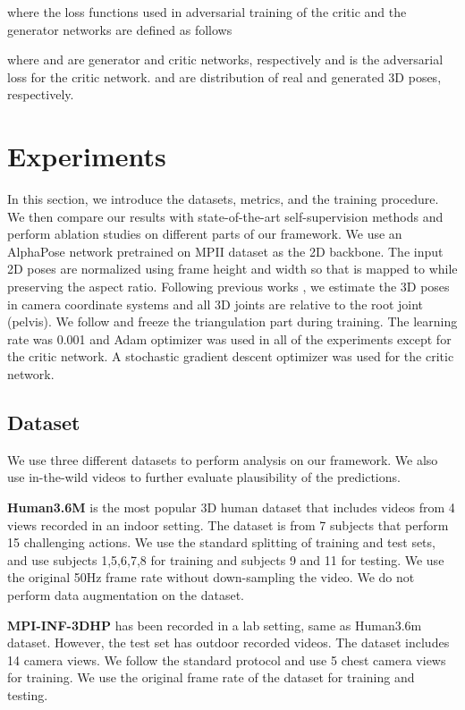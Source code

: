 \documentclass[10pt,twocolumn,letterpaper]{article}
\begin{document}
where the loss functions used in adversarial training of the critic and the generator networks are defined as follows


where  and  are generator and critic networks, respectively and  is the adversarial loss for the critic network.  and  are distribution of real and generated 3D poses, respectively. 


\section{Experiments}

In this section, we introduce the datasets, metrics, and the training procedure. We then compare our results with state-of-the-art self-supervision methods and perform ablation studies on different parts of our framework. We use an AlphaPose network \cite{xiu2018poseflow, fang2017rmpe} pretrained on MPII dataset \cite{Andriluka_2014_CVPR} as the 2D backbone. The input 2D poses are normalized using frame height  and width  so that  is mapped to  while preserving the aspect ratio. Following previous works \cite{Martinez_2017_ICCV,Pavllo_2019_CVPR,Hossain_2018_ECCV}, we estimate the 3D poses in camera coordinate systems and all 3D joints are relative to the root joint (pelvis). We follow \cite{Kocabas_2019_CVPR} and freeze the triangulation part during training. The learning rate was 0.001 and Adam optimizer was used in all of the experiments except for the critic network. A stochastic gradient descent optimizer was used for the critic network.    
\subsection{Dataset}
We use three different datasets to perform analysis on our framework. We also use in-the-wild videos to further evaluate plausibility of the predictions.

\textbf{Human3.6M} \cite{h36m_pami} is the most popular 3D human dataset that includes videos from 4 views recorded in an indoor setting. The dataset is from 7 subjects that perform 15 challenging actions. We use the standard splitting of training and test sets, and use subjects 1,5,6,7,8 for training and subjects 9 and 11 for testing. We use the original 50Hz frame rate without down-sampling the video. We do not perform data augmentation on the dataset.

\textbf{MPI-INF-3DHP} \cite{mehta2017monocular} has been recorded in a lab setting, same as Human3.6m dataset. However, the test set has outdoor recorded videos. The dataset includes 14 camera views. We follow the standard protocol and use 5 chest camera views for training. We use the original frame rate of the dataset for training and testing. 
\end{document}
